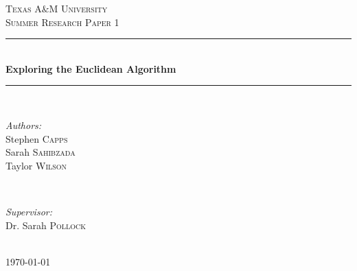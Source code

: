 \documentclass[11pt]{article}
\begin{document}
\begin{titlepage}

\newcommand{\HRule}{\rule{\linewidth}{0.5mm}} 

\center %
 

\textsc{\LARGE Texas A$\&$M University}\\[1.5cm] 
\textsc{\Large Summer Research Paper 1}\\[0.5cm] %


\HRule \\[0.4cm]
{ \huge \bfseries Exploring the Euclidean Algorithm}\\[0.4cm] 
\HRule \\[1.5cm]
 

\begin{minipage}{0.4\textwidth}
\begin{flushleft} \large
\emph{Authors:}\\
Stephen \textsc{Capps}\\
Sarah \textsc{Sahibzada}\\
Taylor \textsc{Wilson}
\end{flushleft}
\end{minipage}
~
\begin{minipage}{0.4\textwidth}
\begin{flushright} \large
\emph{Supervisor:} \\
Dr. Sarah \textsc{Pollock} 
\end{flushright}
\end{minipage}\\[4cm]


{\large \today}\\[3cm] 


 

\vfill 

\end{titlepage}
\end{document}

